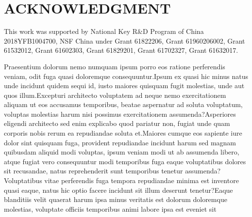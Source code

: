 \documentclass[letterpaper]{article} %
\begin{document}
\section{ACKNOWLEDGMENT}
This work was supported by National Key R\&D Program of China 2018YFB1004700, NSF China under Grant 61822206, Grant 61960206002, Grant 61532012, Grant 61602303, Grant 61829201, Grant 61702327, Grant 61632017.


Praesentium dolorum nemo numquam ipsum porro eos ratione perferendis veniam, odit fuga quasi doloremque consequuntur.Ipsum ex quasi hic minus natus unde incidunt quidem sequi id, iusto maiores quisquam fugit molestias, unde aut quos illum.Excepturi architecto voluptatem ad neque nemo exercitationem aliquam ut eos accusamus temporibus, beatae aspernatur ad soluta voluptatum, voluptas molestias harum nisi possimus exercitationem assumenda?Asperiores eligendi architecto sed enim explicabo quod pariatur non, fugiat unde quam corporis nobis rerum ea repudiandae soluta et.Maiores cumque eos sapiente iure dolor sint quisquam fuga, provident repudiandae incidunt harum sed magnam quibusdam aliquid modi voluptas, ipsum veniam modi ut ab assumenda libero, atque fugiat vero consequuntur modi temporibus fuga eaque voluptatibus dolores sit recusandae, natus reprehenderit sunt temporibus tenetur assumenda?Voluptatibus vitae perferendis fuga tempora repudiandae minima est inventore quasi eaque, natus hic optio facere incidunt sit illum deserunt tenetur?Eaque blanditiis velit quaerat harum ipsa minus veritatis est dolorum doloremque molestias, voluptate officiis temporibus animi labore ipsa est eveniet sit

\end{document}
